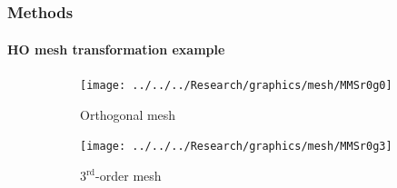 \documentclass[compress,t]{beamer}
\begin{document}
\begin{frame}

\end{frame}

\subsection{}

\begin{frame}
\frametitle{Methods}
\framesubtitle{HO mesh transformation example}

\begin{figure}[!htb]
\centering
\begin{subfigure}{0.45\textwidth}
\centering
\texttt{[image: ../../../Research/graphics/mesh/MMSr0g0]}

{\small Orthogonal mesh}
\end{subfigure}%
\hspace{0.05\textwidth}
\begin{subfigure}{0.45\textwidth}
\centering
\texttt{[image: ../../../Research/graphics/mesh/MMSr0g3]}

{\small $3^\text{rd}$-order mesh}
\end{subfigure}
\end{figure}

\end{frame}

\end{document}
